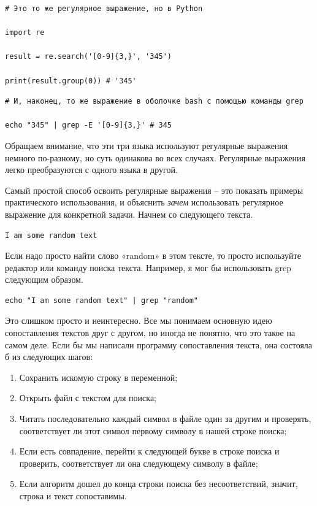 \documentclass[a4paper,12pt,final,openany]{extbook}
\providecommand{\tightlist}{%
  \setlength{\itemsep}{0pt}\setlength{\parskip}{0pt}}
\begin{document}
\begin{verbatim}
# Это то же регулярное выражение, но в Python

import re

result = re.search('[0-9]{3,}', '345')

print(result.group(0)) # '345'
\end{verbatim}

\begin{verbatim}
# И, наконец, то же выражение в оболочке bash с помощью команды grep

echo "345" | grep -E '[0-9]{3,}' # 345
\end{verbatim}

Обращаем внимание, что эти три языка используют регулярные выражения
немного по-разному, но суть одинакова во всех случаях.
Регулярные выражения легко преобразуются с одного языка в другой.

Самый простой способ освоить регулярные выражения -- это показать примеры
практического использования, и объяснить \emph{зачем} использовать
регулярное выражение для конкретной задачи. Начнем со следующего текста.
\begin{verbatim}
I am some random text
\end{verbatim}

Если надо просто найти слово «random» в этом тексте, то просто
используйте редактор или команду поиска текста. Например, я мог бы
использовать grep следующим образом.
\begin{verbatim}
echo "I am some random text" | grep "random"
\end{verbatim}

Это слишком просто и неинтересно. Все мы понимаем основную идею
сопоставления текстов друг с другом, но иногда не понятно, что это такое
на самом деле. Если бы мы написали программу сопоставления текста, она
состояла б из следующих шагов:
\begin{enumerate}
\tightlist
\item
  Сохранить искомую строку в переменной;
\item
  Открыть файл с текстом для поиска;
\item
  Читать последовательно каждый символ в файле один за другим и
  проверять, соответствует ли этот символ первому символу в нашей строке
  поиска;
\item
  Если есть совпадение, перейти к следующей букве в строке поиска и
  проверить, соответствует ли она следующему символу в файле;
\item
  Если алгоритм дошел до конца строки поиска без несоответствий, значит,
  строка и текст сопоставимы.
\end{enumerate}
\end{document}
